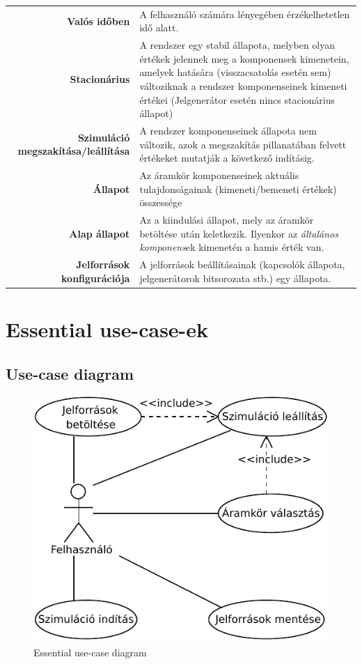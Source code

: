 \begin{longtable}{r p{10.95cm}}
\textbf{Valós időben} & A felhasználó számára lényegében érzékelhetetlen idő alatt.\\
\textbf{Stacionárius} & A rendszer egy stabil állapota, melyben olyan értékek jelennek meg a komponensek kimenetein, amelyek hatására (visszacsatolás esetén sem) változiknak a rendszer komponenseinek kimeneti értékei (Jelgenerátor esetén nincs stacionárius állapot)\\
\textbf{Szimuláció megszakítása/leállítása} & A rendszer komponenseinek állapota nem változik, azok a megszakítás pillanatában felvett értékeket mutatják a következő indításig.\\
\textbf{Állapot} & Az áramkör komponenseinek aktuális tulajdonságainak (kimeneti/bemeneti értékek) összessége \\
\textbf{Alap állapot} & Az a kiindulási állapot, mely az áramkör betöltése után keletkezik. Ilyenkor az \emph{általános komponens}ek kimenetén a hamis érték van.\\
\textbf{Jelforrások konfigurációja} & A jelforrások beállításainak (kapcsolók állapota, jelgenerátorok bitsorozata stb.) egy állapota.
\end{longtable}

\section{Essential use-case-ek}

\subsection{Use-case diagram}

\begin{figure}[H]
\begin{center}
\includegraphics{chapters/chapter02/usecase.pdf}
\caption{Essential use-case diagram}
\label{fig:useCase1}
\end{center}
\end{figure}

